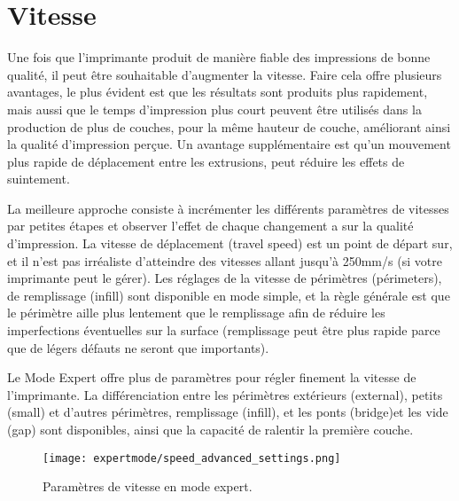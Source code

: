 
\section{Vitesse} %
\label{sec:speed}

Une fois que l'imprimante produit de mani\`ere fiable des impressions de bonne qualit\'e, il peut \^etre souhaitable d'augmenter la vitesse. Faire cela offre plusieurs avantages, le plus \'evident est que les r\'esultats sont produits plus rapidement, mais aussi que le temps d'impression plus court peuvent \^etre utilis\'es dans la production de plus de couches, pour la m\^eme hauteur de couche, am\'eliorant ainsi la qualit\'e d'impression perçue. Un avantage suppl\'ementaire est qu'un mouvement plus rapide de d\'eplacement entre les extrusions, peut r\'eduire les effets de suintement.

La meilleure approche consiste \`a incr\'ementer les diff\'erents param\`etres de vitesses par petites \'etapes et observer l'effet de chaque changement a sur la qualit\'e d'impression. La vitesse de d\'eplacement (travel speed) est un point de d\'epart sur, et il n'est pas irr\'ealiste d'atteindre des vitesses allant jusqu'\`a 250mm/s (si votre imprimante peut le g\'erer). Les r\'eglages de la vitesse de p\'erim\`etres (p\'erimeters), de remplissage (infill) sont disponible en mode simple, et la r\`egle g\'en\'erale est que le p\'erim\`etre aille plus lentement que le remplissage afin de r\'eduire les imperfections \'eventuelles sur la surface (remplissage peut \^etre plus rapide parce que de l\'egers d\'efauts ne seront que importants).

Le Mode Expert offre plus de param\`etres pour r\'egler finement la vitesse de l'imprimante. La diff\'erenciation entre les p\'erim\`etres ext\'erieurs (external), petits (small) et d'autres p\'erim\`etres, remplissage (infill), et les ponts (bridge)et les vide (gap) sont disponibles, ainsi que la capacit\'e de ralentir la premi\`ere couche.

\begin{figure}[H]
\centering
\texttt{[image: expertmode/speed\_advanced\_settings.png]}
\caption{Param\`etres de vitesse en mode expert.}
\label{fig:speed_advanced_settings}
\end{figure}


